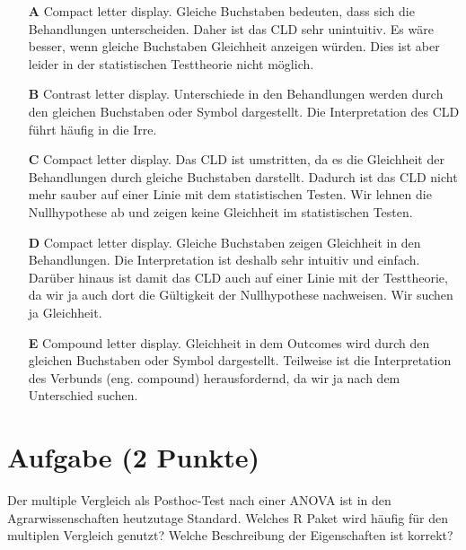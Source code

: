 \documentclass[a4paper, 9pt]{scrartcl}\usepackage[]{graphicx}\usepackage[]{xcolor}
\begin{document}
\begin{enumerate}
\item [\textbf{A} \msquare] Compact letter display. Gleiche Buchstaben bedeuten, dass sich die Behandlungen unterscheiden. Daher ist das CLD sehr unintuitiv. Es wäre besser, wenn gleiche Buchstaben Gleichheit anzeigen würden. Dies ist aber leider in der statistischen Testtheorie nicht möglich.
\item [\textbf{B} \msquare] Contrast letter display. Unterschiede in den Behandlungen werden durch den gleichen Buchstaben oder Symbol dargestellt. Die Interpretation des CLD führt häufig in die Irre.
\item [\textbf{C} \msquare] Compact letter display. Das CLD ist umstritten, da es die Gleichheit der Behandlungen durch gleiche Buchstaben darstellt. Dadurch ist das CLD nicht mehr sauber auf einer Linie mit dem statistischen Testen. Wir lehnen die Nullhypothese ab und zeigen keine Gleichheit im statistischen Testen.
\item [\textbf{D} \msquare] Compact letter display. Gleiche Buchstaben zeigen Gleichheit in den Behandlungen. Die Interpretation ist deshalb sehr intuitiv und einfach. Darüber hinaus ist damit das CLD auch auf einer Linie mit der Testtheorie, da wir ja auch dort die Gültigkeit der Nullhypothese nachweisen. Wir suchen ja Gleichheit.
\item [\textbf{E} \msquare] Compound letter display. Gleichheit in dem Outcomes wird durch den gleichen Buchstaben oder Symbol dargestellt. Teilweise ist die Interpretation des Verbunds (eng. compound) herausfordernd, da wir ja nach dem Unterschied suchen.
\end{enumerate}

\section{Aufgabe \hfill (2 Punkte)}




Der multiple Vergleich als Posthoc-Test nach einer ANOVA ist in den Agrarwissenschaften heutzutage Standard. Welches R Paket wird häufig für den multiplen Vergleich genutzt? Welche Beschreibung der Eigenschaften ist korrekt?
\end{document}
